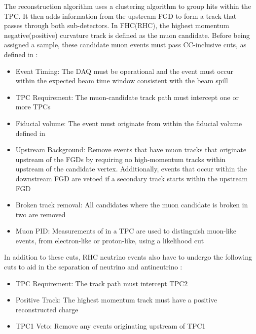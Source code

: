 The reconstruction algorithm uses a clustering algorithm to group hits within the TPC. It then adds information from the upstream FGD to form a track that passes through both sub-detectors. In FHC(RHC), the highest momentum negative(positive) curvature track is defined as the muon candidate. Before being assigned a sample, these candidate muon events must pass CC-inclusive cuts, as defined in \cite{t2k_tn_212}:

\begin{itemize}
\item Event Timing: The DAQ must be operational and the event must occur within the expected beam time window consistent with the beam spill
\item TPC Requirement: The muon-candidate track path must intercept one or more TPCs
\item Fiducial volume: The event must originate from within the fiducial volume defined in \cite{thesis_will}
\item Upstream Background: Remove events that have muon tracks that originate upstream of the FGDs by requiring no high-momentum tracks within  upstream of the candidate vertex. Additionally, events that occur within the downstream FGD are vetoed if a secondary track starts within the upstream FGD
\item Broken track removal: All candidates where the muon candidate is broken in two are removed
\item Muon PID: Measurements of  in a TPC are used to distinguish muon-like events, from electron-like or proton-like, using a likelihood cut
\end{itemize}

In addition to these cuts, RHC neutrino events also have to undergo the following cuts to aid in the separation of neutrino and antineutrino \cite{t2k_tn_246}:

\begin{itemize}
\item TPC Requirement: The track path must intercept TPC2
\item Positive Track: The highest momentum track must have a positive reconstructed charge
\item TPC1 Veto: Remove any events originating upstream of TPC1
\end{itemize}

